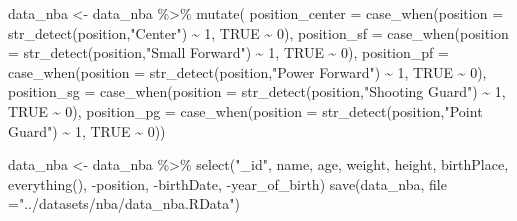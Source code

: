 \documentclass[
]{book}
\newenvironment{Shaded}{\begin{snugshade}}{\end{snugshade}}
\newcommand{\AttributeTok}[1]{\textcolor[rgb]{0.77,0.63,0.00}{#1}}
\newcommand{\AttributeTok}[1]{\textcolor[rgb]{0.13,0.29,0.53}{#1}}
\newcommand{\ConstantTok}[1]{\textcolor[rgb]{0.00,0.00,0.00}{#1}}
\newcommand{\ConstantTok}[1]{\textcolor[rgb]{0.56,0.35,0.01}{#1}}
\newcommand{\DecValTok}[1]{\textcolor[rgb]{0.00,0.00,0.81}{#1}}
\newcommand{\FunctionTok}[1]{\textcolor[rgb]{0.00,0.00,0.00}{#1}}
\newcommand{\FunctionTok}[1]{\textcolor[rgb]{0.13,0.29,0.53}{\textbf{#1}}}
\newcommand{\NormalTok}[1]{#1}
\newcommand{\OtherTok}[1]{\textcolor[rgb]{0.56,0.35,0.01}{#1}}
\newcommand{\SpecialCharTok}[1]{\textcolor[rgb]{0.00,0.00,0.00}{#1}}
\newcommand{\SpecialCharTok}[1]{\textcolor[rgb]{0.81,0.36,0.00}{\textbf{#1}}}
\newcommand{\StringTok}[1]{\textcolor[rgb]{0.31,0.60,0.02}{#1}}
\begin{document}
\begin{Shaded}
\begin{Highlighting}[]
\NormalTok{data\_nba }\OtherTok{\textless{}{-}}\NormalTok{ data\_nba }\SpecialCharTok{\%\textgreater{}\%}
  \FunctionTok{mutate}\NormalTok{(}
    \AttributeTok{position\_center =} 
      \FunctionTok{case\_when}\NormalTok{(}\AttributeTok{position =} \FunctionTok{str\_detect}\NormalTok{(position,}\StringTok{"Center"}\NormalTok{) }\SpecialCharTok{\textasciitilde{}} \DecValTok{1}\NormalTok{,}
                \ConstantTok{TRUE} \SpecialCharTok{\textasciitilde{}} \DecValTok{0}\NormalTok{),}
    \AttributeTok{position\_sf =} 
      \FunctionTok{case\_when}\NormalTok{(}\AttributeTok{position =} \FunctionTok{str\_detect}\NormalTok{(position,}\StringTok{"Small Forward"}\NormalTok{) }\SpecialCharTok{\textasciitilde{}} \DecValTok{1}\NormalTok{,}
                \ConstantTok{TRUE} \SpecialCharTok{\textasciitilde{}} \DecValTok{0}\NormalTok{),}
    \AttributeTok{position\_pf =} 
      \FunctionTok{case\_when}\NormalTok{(}\AttributeTok{position =} \FunctionTok{str\_detect}\NormalTok{(position,}\StringTok{"Power Forward"}\NormalTok{) }\SpecialCharTok{\textasciitilde{}} \DecValTok{1}\NormalTok{,}
                \ConstantTok{TRUE} \SpecialCharTok{\textasciitilde{}} \DecValTok{0}\NormalTok{),}
    \AttributeTok{position\_sg =} 
      \FunctionTok{case\_when}\NormalTok{(}\AttributeTok{position =} \FunctionTok{str\_detect}\NormalTok{(position,}\StringTok{"Shooting Guard"}\NormalTok{) }\SpecialCharTok{\textasciitilde{}} \DecValTok{1}\NormalTok{,}
                \ConstantTok{TRUE} \SpecialCharTok{\textasciitilde{}} \DecValTok{0}\NormalTok{),}
    \AttributeTok{position\_pg =} 
      \FunctionTok{case\_when}\NormalTok{(}\AttributeTok{position =} \FunctionTok{str\_detect}\NormalTok{(position,}\StringTok{"Point Guard"}\NormalTok{) }\SpecialCharTok{\textasciitilde{}} \DecValTok{1}\NormalTok{,}
                \ConstantTok{TRUE} \SpecialCharTok{\textasciitilde{}} \DecValTok{0}\NormalTok{))}



\NormalTok{data\_nba }\OtherTok{\textless{}{-}}\NormalTok{ data\_nba }\SpecialCharTok{\%\textgreater{}\%}
  \FunctionTok{select}\NormalTok{(}\StringTok{"\_id"}\NormalTok{, name, age, weight, height, birthPlace, }\FunctionTok{everything}\NormalTok{(), }\SpecialCharTok{{-}}\NormalTok{position, }\SpecialCharTok{{-}}\NormalTok{birthDate, }\SpecialCharTok{{-}}\NormalTok{year\_of\_birth)}
\FunctionTok{save}\NormalTok{(data\_nba, }\AttributeTok{file =}\StringTok{"../datasets/nba/data\_nba.RData"}\NormalTok{)}
\end{Highlighting}
\end{Shaded}
\end{document}
